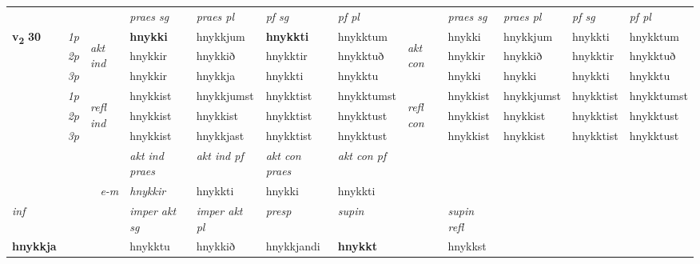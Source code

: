 \begin{longtable}[l]{X>{\footnotesize\itshape}llXXXXlXXXX}
 & &   & \textit{praes sg}  & \textit{praes pl}    & \textit{ pf sg} & \textit{pf pl} & & \textit{praes sg}  & \textit{praes pl}    & \textit{pf sg} & \textit{pf pl }  \\ \cmidrule{4-7} \cmidrule{9-12}
 \multirow{2}{*}{{{\textbf{v{\textsubscript{2}}} \Large{\textbf{30}}}}}  & 1p & \multirow{3}{*}{\begin{turn}{90}\textit{akt ind}\end{turn}} & \textbf{hnykki} & hnykkjum & \textbf{hnykkti} & hnykktum & \multirow{3}{*}{\begin{turn}{90}\textit{akt con}\end{turn}} &hnykki & hnykkjum & hnykkti & hnykktum\\*
 & 2p &  &  hnykkir  & hnykkið & hnykktir & hnykktuð & & hnykkir & hnykkið & hnykktir & hnykktuð \\*
 & 3p &  & hnykkir & hnykkja & hnykkti & hnykktu & & hnykki & hnykki& hnykkti & hnykktu \\*
\cmidrule{4-7} \cmidrule{9-12}
 & 1p & \multirow{3}{*}{\begin{turn}{90}\textit{refl ind}\end{turn}}  & hnykkist & hnykkjumst & hnykktist & hnykktumst & \multirow{3}{*}{\begin{turn}{90}\textit{refl con}\end{turn}}  &hnykkist & hnykkjumst & hnykktist & hnykktumst \\*
 & 2p &  & hnykkist & hnykkist & hnykktist & hnykktust & &hnykkist & hnykkist & hnykktist & hnykktust \\*
 & 3p  & & hnykkist & hnykkjast & hnykktist & hnykktust & & hnykkist & hnykkist& hnykktist & hnykktust \\*
\cmidrule{4-7} \cmidrule{9-12}

   && &  \textit{akt ind praes} & \textit{akt ind pf} & \textit{akt con praes} & \textit{akt con pf} \\*
\multicolumn{3}{r}{\textit{e-m}} & hnykkir & hnykkti & hnykki & hnykkti \\*

\cmidrule{4-7}
   {\textit{inf}} & &  & \textit{imper akt sg} & \textit{imper akt pl}   & \textit{presp} & \textit{supin} && \textit{supin refl}  \\*
  {\textbf{hnykkja}} & && hnykktu  & hnykkið   & hnykkjandi &  \textbf{hnykkt} && hnykkst  \\*

\midrule


\end{longtable}
